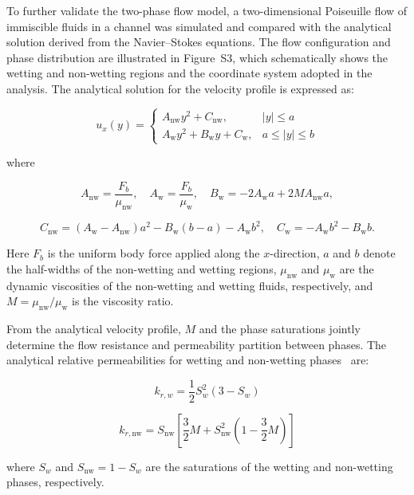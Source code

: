 \documentclass[draft,wrr]{agutexSI2019}
\begin{document}
\begin{article}
To further validate the two-phase flow model, a two-dimensional Poiseuille flow of
immiscible fluids in a channel was simulated and compared with the analytical
solution derived from the Navier--Stokes equations. The flow configuration and
phase distribution are illustrated in Figure~S3, which schematically shows the
wetting and non-wetting regions and the coordinate system adopted in the analysis.
The analytical solution for the velocity profile is expressed as:
\begin{linenomath*}
\begin{equation}
u_x(y)=
\begin{cases}
A_{\mathrm{nw}}y^2 + C_{\mathrm{nw}}, & |y|\le a \\
A_{\mathrm{w}}y^2 + B_{\mathrm{w}}y + C_{\mathrm{w}}, & a \le |y|\le b
\end{cases}
\label{eq:poiseuille_velocity_profile}
\end{equation}
\end{linenomath*}
where
\begin{linenomath*}
\begin{equation}
A_{\mathrm{nw}}=\frac{F_b}{\mu_{\mathrm{nw}}},\quad
A_{\mathrm{w}}=\frac{F_b}{\mu_{\mathrm{w}}},\quad
B_{\mathrm{w}}=-2A_{\mathrm{w}}a+2MA_{\mathrm{nw}}a,
\label{eq:poiseuille_coeff_1}
\end{equation}
\end{linenomath*}
\begin{linenomath*}
\begin{equation}
C_{\mathrm{nw}}=(A_{\mathrm{w}}-A_{\mathrm{nw}})a^2-B_{\mathrm{w}}(b-a)-A_{\mathrm{w}}b^2,\quad
C_{\mathrm{w}}=-A_{\mathrm{w}}b^2-B_{\mathrm{w}}b.
\label{eq:poiseuille_coeff_2}
\end{equation}
\end{linenomath*}
Here $F_b$ is the uniform body force applied along the $x$-direction, $a$ and
$b$ denote the half-widths of the non-wetting and wetting regions,
$\mu_{\mathrm{nw}}$ and $\mu_{\mathrm{w}}$ are the dynamic viscosities of the
non-wetting and wetting fluids, respectively, and
$M=\mu_{\mathrm{nw}}/\mu_{\mathrm{w}}$ is the viscosity ratio.

From the analytical velocity profile, $M$ and the phase saturations jointly
determine the flow resistance and permeability partition between phases. The
analytical relative permeabilities for wetting and non-wetting phases~\cite{liang_analytical_2018} are:
\begin{linenomath*}
\begin{equation}
k_{r,w}=\frac{1}{2}S_w^2(3-S_w)
\label{eq:poiseuille_krw}
\end{equation}
\end{linenomath*}
\begin{linenomath*}
\begin{equation}
k_{r,\mathrm{nw}}=S_{\mathrm{nw}}\left[\frac{3}{2}M+S_{\mathrm{nw}}^2\left(1-\frac{3}{2}M\right)\right]
\label{eq:poiseuille_krnw}
\end{equation}
\end{linenomath*}
where $S_w$ and $S_{\mathrm{nw}}=1-S_w$ are the saturations of the wetting and
non-wetting phases, respectively.


\end{article}
\end{document}
